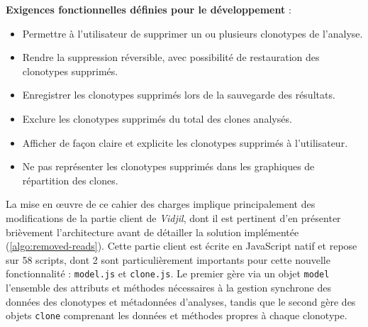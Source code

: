 \textbf{Exigences fonctionnelles définies pour le développement} :
\begin{itemize}
    \item Permettre à l'utilisateur de supprimer un ou plusieurs clonotypes de
          l'analyse.
    \item Rendre la suppression réversible, avec possibilité de restauration
          des clonotypes supprimés.
    \item Enregistrer les clonotypes supprimés lors de la sauvegarde des
          résultats.
    \item Exclure les clonotypes supprimés du total des clones analysés.
    \item Afficher de façon claire et explicite les clonotypes supprimés à
          l'utilisateur.
    \item Ne pas représenter les clonotypes supprimés dans les graphiques de
          répartition des clones.
\end{itemize}

\vspace{1em}

La mise en œuvre de ce cahier des charges implique principalement des
modifications de la partie client de \textit{Vidjil}, dont il est pertinent
d'en présenter brièvement l'architecture avant de détailler la solution
implémentée (\autoref{algo:removed-reads}). 
Cette partie client est écrite en JavaScript natif et repose sur
58 scripts, dont 2 sont particulièrement importants pour cette nouvelle
fonctionnalité : \texttt{model.js} et \texttt{clone.js}. Le premier gère via un
objet \texttt{model} l'ensemble des attributs et méthodes nécessaires à la
gestion synchrone des données des clonotypes et métadonnées d'analyses, tandis
que le second gère des objets \texttt{clone} comprenant les données et méthodes
propres à chaque clonotype.

